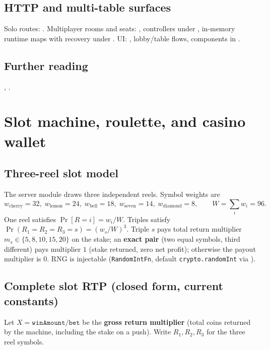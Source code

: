 \documentclass[11pt,a4paper]{article}
\begin{document}
\subsection{HTTP and multi-table surfaces}

Solo routes: . Multiplayer rooms and seats: , controllers under , in-memory runtime maps with recovery under . UI: , lobby/table flows, components in .

\subsection{Further reading}

, .

\section{Slot machine, roulette, and casino wallet}
\label{app:casino}

\subsection{Three-reel slot model}

The server module  draws three independent reels. Symbol weights are
\[
w_{\mathrm{cherry}}=32,\;
w_{\mathrm{lemon}}=24,\;
w_{\mathrm{bell}}=18,\;
w_{\mathrm{seven}}=14,\;
w_{\mathrm{diamond}}=8,\qquad
W=\sum_i w_i = 96 .
\]
One reel satisfies $\operatorname{Pr}[R{=}i]=w_i/W$. Triples satisfy $\operatorname{Pr}(R_1{=}R_2{=}R_3{=}s)=(w_s/W)^3$. Triple $s$ pays total return multiplier $m_s\in\{5,8,10,15,20\}$ on the stake; an \textbf{exact pair} (two equal symbols, third different) pays multiplier $1$ (stake returned, zero net profit); otherwise the payout multiplier is $0$. RNG is injectable (\texttt{RandomIntFn}, default \texttt{crypto.randomInt} via ).

\subsection{Complete slot RTP (closed form, current constants)}

Let $X=\texttt{winAmount}/\texttt{bet}$ be the \textbf{gross return multiplier} (total coins returned by the machine, including the stake on a push). Write $R_1,R_2,R_3$ for the three reel symbols.
\end{document}
